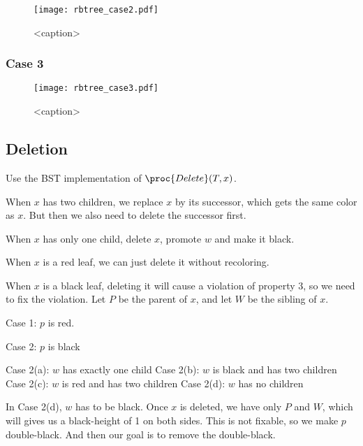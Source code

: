 \begin{figure}[htbp]
    \centering
    \texttt{[image: rbtree\_case2.pdf]}
    \caption{<caption>}
    \label{fig:rbtree_case2}
\end{figure}

\subsubsection{Case 3}

\begin{figure}[htbp]
    \centering
    \texttt{[image: rbtree\_case3.pdf]}
    \caption{<caption>}
    \label{fig:rbtree_case3}
\end{figure}

\subsection{Deletion}

Use the BST implementation of $\proc{Delete}(T,x)$. 

When $x$ has two children, we replace $x$ by its successor, which gets the same color as $x$. But then we also need to delete the successor first.

When $x$ has only one child, delete $x$, promote $w$ and make it black.


When $x$ is a red leaf, we can just delete it without recoloring. 

When $x$ is a black leaf, deleting it will cause a violation of property 3, so we need to fix the violation. Let $P$ be the parent of $x$, and let $W$ be the sibling of $x$.

Case 1: $p$ is red.

Case 2: $p$ is black

Case 2(a): $w$ has exactly one child
Case 2(b): $w$ is black and has two children
Case 2(c): $w$ is red and has two children
Case 2(d): $w$ has no children

In Case 2(d), $w$ has to be black. Once $x$ is deleted, we have only $P$ and $W$, which will gives us a black-height of 1 on both sides. This is not fixable, so we make $p$ double-black. And then our goal is to remove the double-black.

